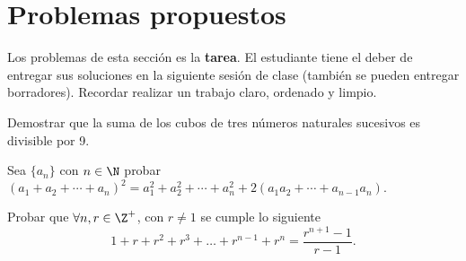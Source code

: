 \section{Problemas propuestos}

Los problemas de esta sección es la \textbf{tarea}.
El estudiante tiene el deber de entregar sus soluciones en la siguiente sesión de clase (también se pueden entregar borradores).
Recordar realizar un trabajo claro, ordenado y limpio.


\begin{exercise}
    Demostrar que la suma de los cubos de tres números naturales sucesivos es divisible por 9.
\end{exercise}

\begin{exercise}
    Sea $\{a_n\}$ con $n \in \N$ probar $(a_1 + a_2 + \cdots + a_n)^2 = a_1^2 + a_2^2 + \cdots + a_n^2 + 2(a_1 a_2 + \cdots + a_{n - 1} a_n).$
\end{exercise}

\begin{exercise}
    Probar que $\forall n, r \in \Z^+$, con $r \neq 1$ se cumple lo siguiente
    \[1 + r + r^2 + r^3 + \dots + r^{n-1} + r^n = \frac{r^{n + 1} - 1}{r - 1}.\]
\end{exercise}
